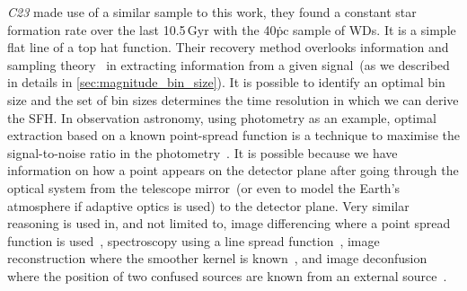 \documentclass[fleqn,usenatbib]{mnras}
\begin{document}


\textit{C23} made use of a similar sample to this work, they found a constant star 
formation rate over the last 10.5\,Gyr 
with the 40\.pc sample of WDs. It is a simple flat line of a top hat function. 
Their recovery method overlooks information and sampling 
theory~\citep{1949IEEEP..37...10S} in extracting information from a given
signal~(as we described in details in \ref{sec:magnitude_bin_size}). It is 
possible to identify an optimal bin size and the set of bin sizes determines
the time resolution in which we can derive the SFH. In observation astronomy,
using photometry as an example, optimal extraction based on a known
point-spread function is a technique to maximise the signal-to-noise ratio in
the photometry~\citep{1980SPIE..264..171T, 1987PASP...99..191S}. It is possible
because we have information on how a point appears on the detector plane after 
going through the optical system from the telescope mirror~(or even to model
the Earth's atmosphere if adaptive optics is used) to the detector plane. Very 
similar reasoning is used in, and not limited to, image differencing where a
point spread function is used~\citep{1998ApJ...503..325A, 2008MNRAS.386L..77B, 
2009MNRAS.397.2099A, 2016ApJ...830...27Z}, spectroscopy using a line spread
function~\citep{1986PASP...98..609H, 1989PASP..101.1032M, 2003PASP..115..688K},
image reconstruction where the smoother kernel is
known~\citep{1972JOSA...62...55R, 1974AJ.....79..745L}, and image
deconfusion where the position of two confused sources are known from an
external source~\citep{2015A&A...582A..15M}.
\end{document}
